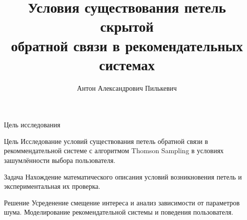 \documentclass{beamer}
\title[\hbox to 56mm{Петли скрытой обратной связи}]{ Условия существования петель скрытой \\ обратной связи в рекомендательных системах }
\author[А.\,А. Пилькевич]{Антон Александрович Пилькевич}
\institute{Московский физико-технический институт}
\date{\footnotesize
\par\smallskip\emph{Курс:} Автоматизация научных исследований\par (практика, В.\,В.~Стрижов)/Группа 813
\par\smallskip\emph{Эксперт:} А.\,С.~Хританков
\par\smallskip\emph{Консультант:} А.\,С.~Хританков
\par\bigskip\small 2021}
\begin{document}
\begin{frame}
\thispagestyle{empty}
\maketitle
\end{frame}
\begin{frame}{Цель исследования}
\begin{block}{Цель}
  Исследование условий существования петель обратной
связи в рекоммендательной системе с алгоритмом Thomson Sampling в условиях зашумлённости выбора пользователя.
\end{block}
\begin{block}{Задача}
  Нахождение математического описания условий возникновения петель и экспериментальная их проверка. 
\end{block}
\begin{block}{Решение}
  Усреденение смещение интереса и анализ зависимости от параметров шума. 
  Моделирование рекомендательной системы и поведения пользователя.
\end{block}
\end{frame}
\end{document}
